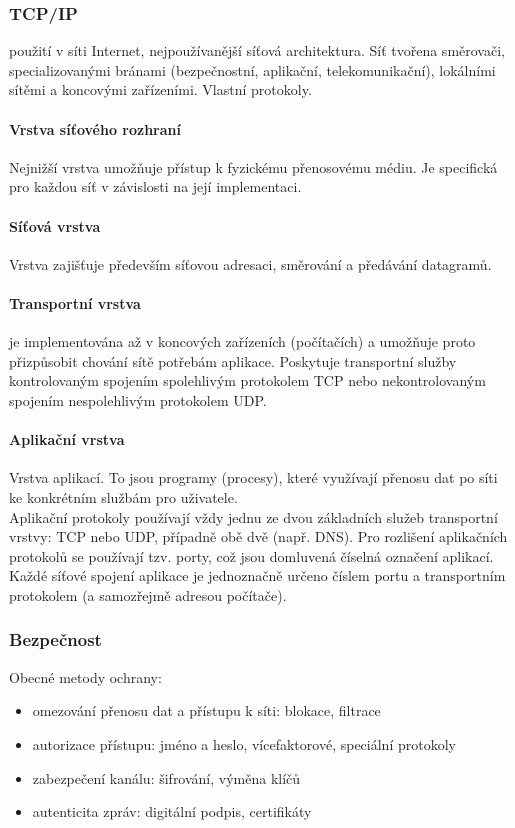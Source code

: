 \documentclass[10pt,a4paper]{article}
\begin{document}
\subsubsection{TCP/IP}
použití v síti Internet, nejpoužívanější síťová architektura. Síť tvořena směrovači, specializovanými bránami (bezpečnostní, aplikační, telekomunikační), lokálními sítěmi a koncovými zařízeními. Vlastní protokoly.
\paragraph{Vrstva síťového rozhraní} Nejnižší vrstva umožňuje přístup k fyzickému přenosovému médiu. Je specifická pro každou síť v závislosti na její implementaci.
\paragraph{Síťová vrstva} Vrstva zajišťuje především síťovou adresaci, směrování a předávání datagramů.
\paragraph{Transportní vrstva} je implementována až v koncových zařízeních (počítačích) a umožňuje proto přizpůsobit chování sítě potřebám aplikace. Poskytuje transportní služby kontrolovaným spojením spolehlivým protokolem TCP nebo nekontrolovaným spojením nespolehlivým protokolem UDP.
\paragraph{Aplikační vrstva} Vrstva aplikací. To jsou programy (procesy), které využívají přenosu dat po síti ke konkrétním službám pro uživatele. \\
Aplikační protokoly používají vždy jednu ze dvou základních služeb transportní vrstvy: TCP nebo UDP, případně obě dvě (např. DNS). Pro rozlišení aplikačních protokolů se používají tzv. porty, což jsou domluvená číselná označení aplikací. Každé síťové spojení aplikace je jednoznačně určeno číslem portu a transportním protokolem (a samozřejmě adresou počítače).
\subsubsection{Bezpečnost}
Obecné metody ochrany:
\begin{itemize}
	\item omezování přenosu dat a přístupu k síti: blokace, filtrace
	\item autorizace přístupu: jméno a heslo, vícefaktorové, speciální protokoly
	\item zabezpečení kanálu: šifrování, výměna klíčů
	\item autenticita zpráv: digitální podpis, certifikáty
\end{itemize}
\end{document}
